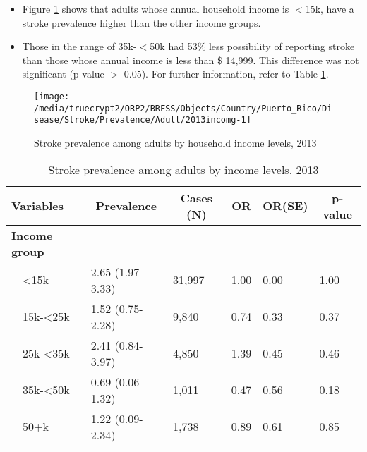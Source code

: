  
 
 \newpage
\begin{itemize}

\item Figure \ref{fig:income.Stroke.2013} shows that adults whose annual household income is 
$<$15k, have a stroke prevalence higher than the other income groups.

\item Those in the range of 35k-$<$50k had 53\% less possibility of reporting stroke than those whose annual income is less than \$ 14,999. This difference was not significant (p-value $>$ 0.05).  For further information, refer to Table \ref{tab:income.Stroke.2013}.

\end{itemize}

\begin{figure}[H]
\caption{Stroke prevalence among adults by household income levels, 
         2013}
\begin{knitrout}
\color{fgcolor}

{\centering \texttt{[image: /media/truecrypt2/ORP2/BRFSS/Objects/Country/Puerto\_Rico/Disease/Stroke/Prevalence/Adult/2013incomg-1]} 

}



\end{knitrout}
 \label{fig:income.Stroke.2013}
\end{figure}

\begin{table}[H]
\caption{Stroke prevalence  among adults by income levels, 2013\label{tab:income.Stroke.2013}} 
\begin{center}
\begin{tabular}{llllll}
\hline\hline
\multicolumn{1}{l}{Variables}&\multicolumn{1}{c}{Prevalence}&\multicolumn{1}{c}{Cases (N)}&\multicolumn{1}{c}{OR}&\multicolumn{1}{c}{OR(SE)}&\multicolumn{1}{c}{p-value}\tabularnewline
\hline
{\bfseries Income group}&&&&&\tabularnewline
~~\textless15k&2.65 (1.97-3.33)&31,997&1.00&0.00&1.00\tabularnewline
~~15k-\textless25k&1.52 (0.75-2.28)& 9,840&0.74&0.33&0.37\tabularnewline
~~25k-\textless35k&2.41 (0.84-3.97)& 4,850&1.39&0.45&0.46\tabularnewline
~~35k-\textless50k&0.69 (0.06-1.32)& 1,011&0.47&0.56&0.18\tabularnewline
~~50+k&1.22 (0.09-2.34)& 1,738&0.89&0.61&0.85\tabularnewline
\hline
\end{tabular}\end{center}

\end{table}

